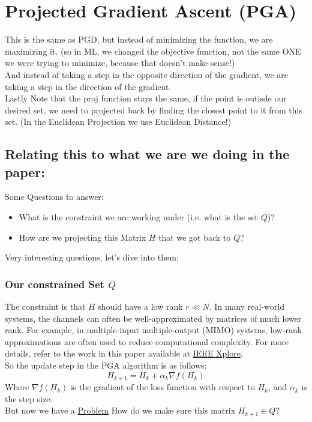 \documentclass{article}
\begin{document}
\section{Projected Gradient Ascent (PGA)}
This is the same as PGD, but instead of minimizing the function, we are maximizing it. (so in ML, we changed the objective function, not the same ONE we were trying to minimize, because that doesn't make sense!) \\ 
And instead of taking a step in the opposite direction of the gradient, we are taking a step in the direction of the gradient. \\ 
Lastly Note that the proj function stays the same, if the point is outisde our desired set, we need to projected back by finding the closest point to it from this set. (In the Euclidean Projection we use Euclidean Distance!) 
\subsection*{Relating this to what we are we doing in the paper:}
Some Questions to answer: 
\begin{itemize}
  \item What is the constraint we are working under (i.e. what is the set $Q$)?
  \item How are we projecting this Matrix $H$ that we got back to $Q$? 
\end{itemize}
Very interesting questions, let's dive into them: 
\subsubsection*{Our constrained Set $Q$}
The constraint is that \( H \) should have a low rank \( r \ll N \). In many real-world systems, the channels can often be well-approximated by matrices of much lower rank. For example, in multiple-input multiple-output (MIMO) systems, low-rank approximations are often used to reduce computational complexity. For more details, refer to the work in this paper \cite{myers2020} available at \href{https://ieeexplore.ieee.org/document/9053514}{IEEE Xplore}. \\ 
So the update step in the PGA algorithm is as follows:
\[
H_{k+1} = H_k + \alpha_k \nabla f(H_k)
\]
Where \( \nabla f(H_k) \) is the gradient of the loss function with respect to \( H_k \), and \( \alpha_k \) is the step size. \\
But now we have a \underline{Problem} How do we make sure this matrix $H_{k+1} \in Q?$  
\end{document}
